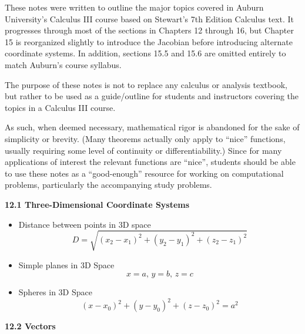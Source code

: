 \newcommand{\thetitle}{
  Stewart's Calculus Chapter 12-16 | Lecture Notes
}





These notes were written to outline the major topics covered in Auburn University's Calculus III course based on Stewart's 7th Edition Calculus text. It progresses through most of the sections in Chapters 12 through 16, but Chapter 15 is reorganized slightly to introduce the Jacobian before introducing alternate coordinate systems. In addition, sections 15.5 and 15.6 are omitted entirely to match Auburn's course syllabus.

The purpose of these notes is not to replace any calculus or analysis textbook, but rather to be used as a guide/outline for students and instructors covering the topics in a Calculus III course.

As such, when deemed necessary, mathematical rigor is abandoned for the sake of simplicity or brevity. (Many theorems actually only apply to ``nice'' functions, usually requiring some level of continuity or differentiability.) Since for many applications of interest the relevant functions are ``nice'', students should be able to use these notes as a ``good-enough'' resource for working on computational problems, particularly the accompanying study problems.

\newpage

\centerline{\bf 12.1 Three-Dimensional Coordinate Systems}

  \begin{itemize}
  \item Distance between points in 3D space
    \[D = \sqrt{(x_2 - x_1)^2 + (y_2 - y_1)^2 + (z_2 - z_1)^2}\]
    
  \item Simple planes in 3D Space
    \[x=a,\, y=b,\, z=c\]
  
  \item Spheres in 3D Space
    \[(x-x_0)^2 + (y-y_0)^2 + (z-z_0)^2 = a^2\]
  \end{itemize}

\hr

\centerline{\bf 12.2 Vectors}

